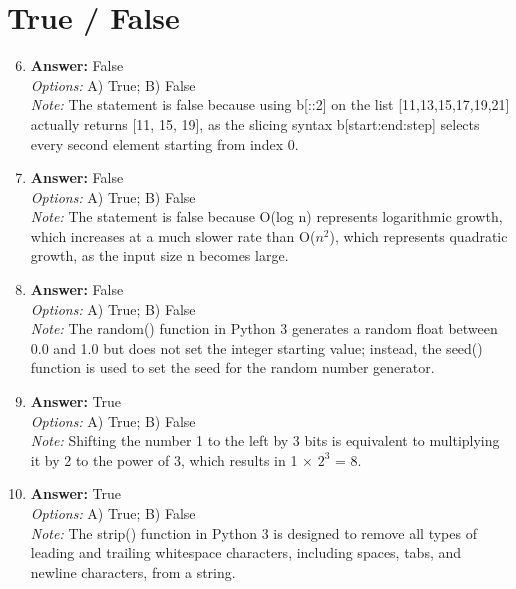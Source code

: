 \documentclass[12pt]{article}
\begin{document}
\section*{True / False}
\begin{enumerate}[label=\arabic*.]
\setcounter{enumi}{5}
\item \textbf{Answer:} False
\\ \textit{Options:} A) True; B) False
\\ \textit{Note:} The statement is false because using b[::2] on the list [11,13,15,17,19,21] actually returns [11, 15, 19], as the slicing syntax b[start:end:step] selects every second element starting from index 0.
\item \textbf{Answer:} False
\\ \textit{Options:} A) True; B) False
\\ \textit{Note:} The statement is false because O(log n) represents logarithmic growth, which increases at a much slower rate than O($n^2$), which represents quadratic growth, as the input size n becomes large.
\item \textbf{Answer:} False
\\ \textit{Options:} A) True; B) False
\\ \textit{Note:} The random() function in Python 3 generates a random float between 0.0 and 1.0 but does not set the integer starting value; instead, the seed() function is used to set the seed for the random number generator.
\item \textbf{Answer:} True
\\ \textit{Options:} A) True; B) False
\\ \textit{Note:} Shifting the number 1 to the left by 3 bits is equivalent to multiplying it by 2 to the power of 3, which results in 1 × $2^3$ = 8.
\item \textbf{Answer:} True
\\ \textit{Options:} A) True; B) False
\\ \textit{Note:} The strip() function in Python 3 is designed to remove all types of leading and trailing whitespace characters, including spaces, tabs, and newline characters, from a string.
\end{enumerate}
\end{document}
